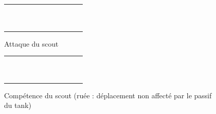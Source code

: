 \documentclass[a4paper]{scrreprt}
\begin{document}
\begin{figure}
    \centering
    \begin{tabular}{|c|c|c|c|c|c|c|c|c|c|c|}
        \hline
        &&&&&&&&&&\\ \hline
        &&&&&&&&&&\\ \hline
        &&&&&&&&&&\\ \hline
        &&&&&\cellcolor{cred}&&&&&\\ \hline
        &&&&\cellcolor{cred}&\cellcolor{cred}&\cellcolor{cred}&&&&\\ \hline
        &&&\cellcolor{cred}&\cellcolor{cred}&\cellcolor{yellow}&\cellcolor{cred}&\cellcolor{cred}&&&\\ \hline
        &&&&\cellcolor{cred}&\cellcolor{cred}&\cellcolor{cred}&&&&\\ \hline
        &&&&&\cellcolor{cred}&&&&&\\ \hline
        &&&&&&&&&&\\ \hline
        &&&&&&&&&&\\ \hline
        &&&&&&&&&&\\ \hline
        
    \end{tabular}
    \caption{Attaque du scout}
    \label{fig:scoutatt}
\end{figure}


\begin{figure}
    \centering
    \begin{tabular}{|c|c|c|c|c|c|c|c|c|c|c|}
        \hline
        &&&&&&&&&&\\ \hline  
        &&&&&&&&&&\\ \hline 
        &&&&&&&&&&\\ \hline 
        &&&&&&&&&&\\ \hline 
        &&&&&\cellcolor{cgreen}&&&&&\\ \hline 
        &&&&\cellcolor{cgreen}&\cellcolor{yellow}&\cellcolor{cgreen}&&&&\\ \hline 
        &&&&&\cellcolor{cgreen}&&&&&\\ \hline 
        &&&&&&&&&&\\ \hline 
        &&&&&&&&&&\\ \hline 
        &&&&&&&&&&\\ \hline 
        &&&&&&&&&&\\ \hline
    
    \end{tabular}
    \caption{Compétence du scout (ruée : déplacement non affecté par le passif du tank)}
    \label{fig:scoutcomp}
\end{figure}
\end{document}

